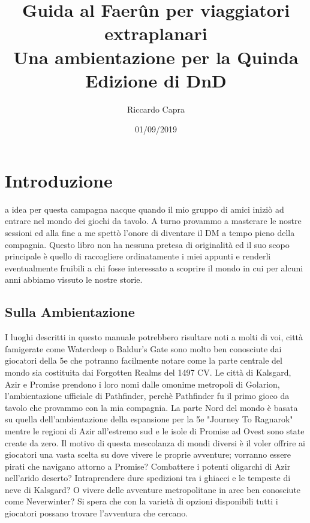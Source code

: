 \documentclass[letterpaper,twocolumn,openany,nodeprecatedcode]{dndbook}
\title{Guida al Faerûn per viaggiatori extraplanari \\
\large Una ambientazione per la Quinda Edizione di DnD}
\author{Riccardo Capra}
\date{01/09/2019}
\begin{document}
\frontmatter

\maketitle

\tableofcontents

\mainmatter%

\chapter{Introduzione}

a idea per questa campagna nacque quando il mio gruppo di amici iniziò ad entrare nel mondo dei giochi da tavolo. A turno provammo a masterare le nostre sessioni ed alla fine a me spettò l'onore di diventare il DM a tempo pieno della compagnia. Questo libro non ha nessuna pretesa di originalità ed il suo scopo principale è quello di raccogliere ordinatamente i miei appunti e renderli eventualmente fruibili a chi fosse interessato a scoprire il mondo in cui per alcuni anni abbiamo vissuto le nostre storie.

\section{Sulla Ambientazione}
I luoghi descritti in questo manuale potrebbero risultare noti a molti di voi, città famigerate come Waterdeep o Baldur's Gate sono molto ben conosciute dai giocatori della 5e che potranno facilmente notare come la parte centrale del mondo sia costituita dai Forgotten Realms del 1497 CV. Le città di Kalsgard, Azir e Promise prendono i loro nomi dalle omonime metropoli di Golarion, l'ambientazione ufficiale di Pathfinder, perchè Pathfinder fu il primo gioco da tavolo che provammo con la mia compagnia. La parte Nord del mondo è basata su quella dell'ambientazione della espansione per la 5e "Journey To Ragnarok" mentre le regioni di Azir all'estremo sud e le isole di Promise ad Ovest sono state create da zero.
Il motivo di questa mescolanza di mondi diversi è il voler offrire ai giocatori una vasta scelta su dove vivere le proprie avventure; vorranno essere pirati che navigano attorno a Promise? Combattere i potenti oligarchi di Azir nell'arido deserto? Intraprendere dure spedizioni tra i ghiacci e le tempeste di neve di Kalsgard? O vivere delle avventure metropolitane in aree ben conosciute come Neverwinter? Si spera che con la varietà di opzioni disponibili tutti i giocatori possano trovare l'avventura che cercano.
\end{document}
